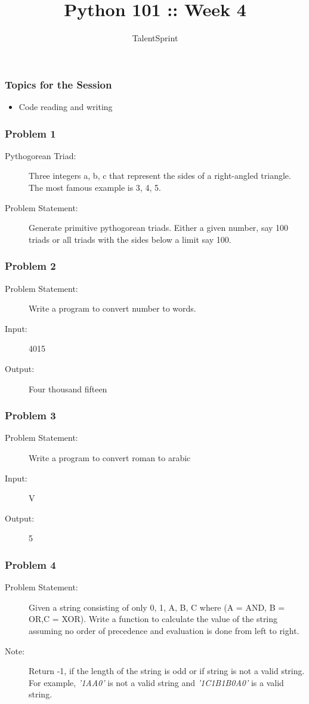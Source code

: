 \documentclass[14pt]{beamer}
\title{Python 101 :: Week 4}
\date{}
\author[TS]{TalentSprint}
\begin{document}
    \begin{frame}
        \titlepage
    \end{frame}
    \begin{frame}
	\frametitle{Topics for the Session}
	\begin{itemize}
	    \item Code reading and writing
	\end{itemize}
    \end{frame}
    \begin{frame}
	\frametitle{Problem 1}
	\begin{description}
	    \item [Pythogorean Triad:] Three integers a, b, c that represent the sides of a right-angled triangle. The most famous example is 3, 4, 5.
	    \item [Problem Statement:] Generate primitive pythogorean triads. Either a given number, say 100 triads or all triads with the sides below a limit say 100.
	\end{description} 
    \end{frame}
    \begin{frame}
	\frametitle{Problem 2}
	\begin{description}
	    \item [Problem Statement:] Write a program to convert number to words.
	    \item [Input:] 4015
	    \item [Output:] Four thousand fifteen
	\end{description}
    \end{frame}
    \begin{frame}
	\frametitle{Problem 3}
	\begin{description}
	    \item [Problem Statement:] Write a program to convert roman to arabic
	    \item [Input:] V
	    \item [Output:] 5
	\end{description}
    \end{frame}
    \begin{frame}
	\frametitle{Problem 4}
	\begin{description}
	    \item [Problem Statement:] Given a string consisting of only 0, 1, A, B, C where (A = AND, B = OR,C = XOR). Write a function to calculate the value of the string assuming no order of precedence and evaluation is done from left to right.
	    \item [Note:] Return -1, if the length of the string is odd or if string is not a valid string. For example, \emph{'1AA0'} is not a valid string and \emph{'1C1B1B0A0'} is a valid string. 
	\end{description}
    \end{frame}
\end{document}
